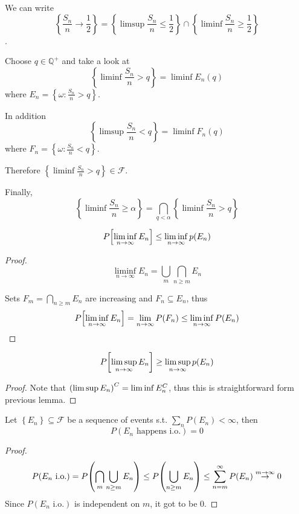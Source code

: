 We can write
$$\left\{ \frac{S_n}{n} \to \frac{1}{2} \right\} = \left\{ \limsup \frac{S_n}{n} \leq \frac{1}{2} \right\} \cap \left\{ \liminf \frac{S_n}{n} \geq \frac{1}{2} \right\}$$.

Choose $q\in \mathbb{Q}^+$ and take a look at $$\left\{ \liminf \frac{S_n}{n} > q \right\} = \liminf E_n(q)$$
where $E_n = \left\{ \omega  : \frac{S_n}{n} > q \right\}$.

In addition
$$\left\{ \limsup \frac{S_n}{n} < q \right\} = \liminf F_n(q)$$
where $F_n = \left\{ \omega  : \frac{S_n}{n} < q \right\}$.

Therefore
$\left\{ \liminf \frac{S_n}{n} > q \right\} \in \mathcal{F}$.


Finally,
$$\left\{ \liminf \frac{S_n}{n} \geq \alpha \right\} = \bigcap_{q<\alpha} \left\{ \liminf \frac{S_n}{n} > q \right\} $$



\begin{lemma}
	$$P\qty[\liminf_{n\to \infty} E_n] \leq \liminf_{n\to \infty} p\qty(E_n)$$
	
	\begin{proof}
		$$\liminf_{n\to \infty} E_n = \bigcup_m \bigcap_{n\geq m} E_n $$
		
		Sets $F_m= \bigcap_{n\geq m} E_n $ are increasing and $F_n \subseteq E_n$, thus
		$$P\qty[\liminf_{n\to \infty} E_n] = \lim_{n\to \infty} P(F_n) \leq \liminf_{n\to \infty} P(E_n)  $$
	\end{proof} 
\end{lemma}


\begin{lemma}
	$$P\qty[\limsup_{n\to \infty} E_n] \geq \limsup_{n\to \infty} p\qty(E_n)$$
	
	\begin{proof}
		Note that $\qty(\limsup E_n)^C = \liminf E_n^C$, thus this is straightforward form previous lemma.
	\end{proof} 
\end{lemma}

\begin{lemma} \label{bc1}
	Let $\left\{ E_n\right\} \subseteq \mathcal{F}$ be a sequence of events s.t. $\sum_n P(E_n) < \infty$, then
	$$P(E_n \text{ happens i.o.}) =0$$
	
	\begin{proof}
		$$P(E_n \text{ i.o.}) = P\qty(\bigcap_m \bigcup_{n\geq m} E_n) \leq  P\qty( \bigcup_{n\geq m} E_n) \leq \sum_{n=m}^\infty P(E_n) \stackrel{m\to \infty}{\to} 0$$
		Since $P(E_n \text{ i.o.})$ is independent on $m$, it got to be $0$.
	\end{proof}
\end{lemma}

